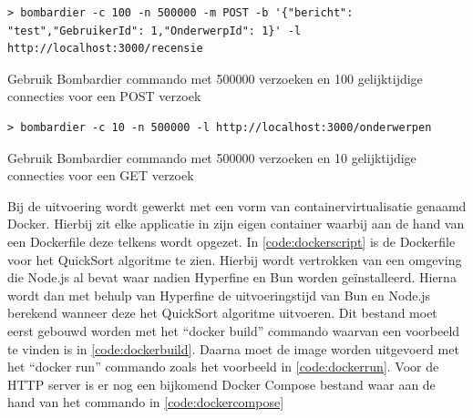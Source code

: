 \begin{listing}[H]
  \centering
  \begin{verbatim}
> bombardier -c 100 -n 500000 -m POST -b '{"bericht": "test","GebruikerId": 1,"OnderwerpId": 1}' -l http://localhost:3000/recensie
      \end{verbatim}
      \caption[Gebruik Bombardier POST verzoek met 100 connecties]{\label{code:Bombardier1000}Gebruik Bombardier commando met 500000 verzoeken en 100 gelijktijdige connecties voor een POST verzoek}
\end{listing}
\begin{listing}[H]
  \centering
  \begin{verbatim}
> bombardier -c 10 -n 500000 -l http://localhost:3000/onderwerpen
      \end{verbatim}
      \caption[Gebruik Bombardier GET verzoek 10 connecties]{\label{code:Bombardier10GET}Gebruik Bombardier commando met 500000 verzoeken en 10 gelijktijdige connecties voor een GET verzoek}
\end{listing}
Bij de uitvoering wordt gewerkt met een vorm van containervirtualisatie genaamd Docker.
Hierbij zit elke applicatie in zijn eigen container waarbij aan de hand van een Dockerfile deze telkens wordt opgezet.
In \ref{code:dockerscript} is de Dockerfile voor het QuickSort algoritme te zien. 
Hierbij wordt vertrokken van een omgeving die Node.js al bevat waar nadien Hyperfine en Bun worden geïnstalleerd.
Hierna wordt dan met behulp van Hyperfine de uitvoeringstijd van Bun en Node.js berekend wanneer deze het QuickSort algoritme uitvoeren.
Dit bestand moet eerst gebouwd worden met het “docker build” commando waarvan een voorbeeld te vinden is in \ref{code:dockerbuild}.
Daarna moet de image worden uitgevoerd met het “docker run” commando zoals het voorbeeld in \ref{code:dockerrun}.
Voor de HTTP server is er nog een bijkomend
Docker Compose bestand waar aan de hand van het commando in \ref{code:dockercompose}
